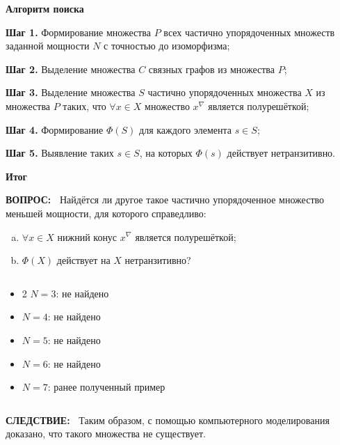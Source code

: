 \documentclass{beamer}
\newcommand{\green}{\color[rgb]{0,0.4,0}}
\newcommand{\blue}{\color{blue}}
\newcommand{\consequence}{%
     {\bf \green СЛЕДСТВИЕ:\ }}
\newcommand{\question}{%
     {\bf \green ВОПРОС:\ }}
\newcommand{\retline}{
	
$ $

}
\begin{document}
\begin{frame}
{\bf {\blue} Алгоритм поиска}

{\bf Шаг 1.}
Формирование множества $P$ всех частично упорядоченных множеств заданной мощности $N$ с точностью до изоморфизма;
\pause

{\bf Шаг 2.}
Выделение множества $C$ связных графов из множества $P$;
\pause

{\bf Шаг 3.}
Выделение множества $S$ частично упорядоченных множества $X$ из множества $P$ таких, что $\forall x \in X$ множество $x^\nabla$ является полурешёткой;
\pause

{\bf Шаг 4.}
Формирование $\Phi(S)$ для каждого элемента $s \in S$;
\pause

{\bf Шаг 5.}
Выявление таких $s \in S$, на которых $\Phi(s)$  действует нетранзитивно.

\end{frame}


\begin{frame}[fragile]
{\bf Итог}

{\question}
Найдётся ли другое такое частично упорядоченное множество меньшей мощности, для которого справедливо:
\begin{enumerate}[(a)]
	\item
$\forall x \in X$ нижний конус $x^\nabla$ является полурешёткой;
	\item
$\Phi(X)$ действует на $X$ нетранзитивно?
\end{enumerate}
{\retline}

\begin{itemize}
\item2
$N = 3$: не найдено
\item
$N = 4$: не найдено
\item
$N = 5$: не найдено
\item
$N = 6$: не найдено
\item
$N = 7$: ранее полученный пример
\end{itemize}

{\retline}

{\consequence}
Таким образом, с помощью компьютерного моделирования доказано, что такого множества не существует.

\end{frame}
\end{document}

